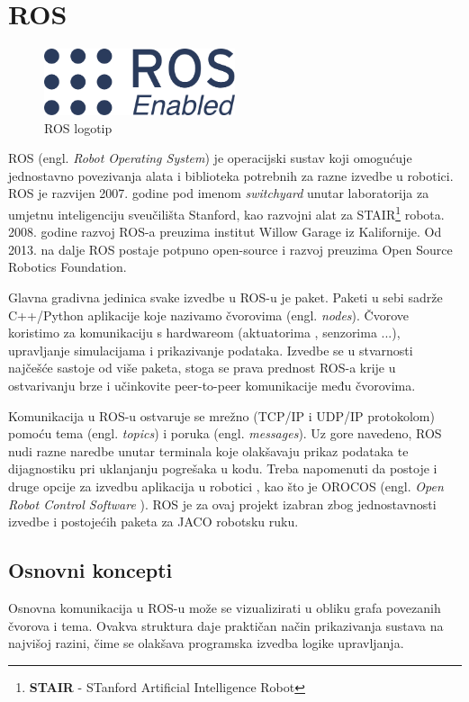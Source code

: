 \documentclass[times, utf8, diplomski, numeric]{fer}
\begin{document}
\section{ROS}
\begin{figure}[h!]
\centering
\includegraphics[width = 0.5\textwidth]{ros_enabled}
\caption{ROS logotip}
\end{figure}
ROS (engl. \textit{Robot Operating System}) je operacijski sustav koji omogućuje jednostavno povezivanja alata i biblioteka potrebnih za razne izvedbe u robotici. 
ROS je razvijen 2007. godine pod imenom \textit{switchyard} unutar laboratorija za umjetnu inteligenciju sveučilišta Stanford, kao razvojni alat za STAIR\footnote{\textbf{STAIR} - STanford Artificial Intelligence Robot} robota.
2008. godine razvoj ROS-a preuzima institut Willow Garage iz Kalifornije. 
Od 2013. na dalje ROS postaje potpuno open-source i razvoj preuzima Open Source Robotics Foundation.

Glavna gradivna jedinica svake izvedbe u ROS-u je paket.
Paketi u sebi sadrže C++/Python aplikacije koje nazivamo čvorovima (engl. \textit{nodes}).
Čvorove koristimo za komunikaciju s hardwareom (aktuatorima , senzorima ...), upravljanje simulacijama i prikazivanje podataka.
Izvedbe se u stvarnosti najčešće sastoje od više paketa, stoga se prava prednost ROS-a krije u ostvarivanju brze i učinkovite peer-to-peer komunikacije među čvorovima.
 
Komunikacija u ROS-u ostvaruje se mrežno (TCP/IP i UDP/IP protokolom) pomoću tema (engl. \textit{topics}) i poruka (engl. \textit{messages}).
Uz gore navedeno, ROS nudi razne naredbe unutar terminala koje olakšavaju prikaz podataka te dijagnostiku pri uklanjanju pogrešaka u kodu. Treba napomenuti da postoje i druge opcije za izvedbu aplikacija u robotici , kao što je OROCOS (engl. \textit{Open Robot Control Software} ). ROS je za ovaj projekt izabran zbog jednostavnosti izvedbe i postojećih paketa za JACO robotsku ruku.
\subsection{Osnovni koncepti}
Osnovna komunikacija u ROS-u može se vizualizirati u obliku grafa povezanih čvorova i tema. Ovakva struktura daje praktičan način prikazivanja sustava na najvišoj razini, čime se olakšava programska izvedba logike upravljanja. 
\end{document}
